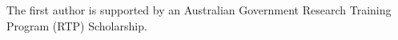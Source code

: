 \begin{acks}
The first author is supported by an Australian Government Research Training Program (RTP) Scholarship.
\end{acks}




